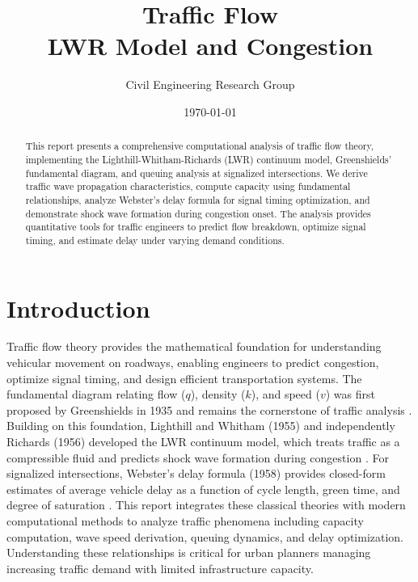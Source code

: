 \documentclass[11pt,a4paper]{article}
\title{Traffic Flow\\LWR Model and Congestion}
\author{Civil Engineering Research Group}
\date{\today}
\begin{document}
\maketitle

\begin{abstract}
This report presents a comprehensive computational analysis of traffic flow theory, implementing the Lighthill-Whitham-Richards (LWR) continuum model, Greenshields' fundamental diagram, and queuing analysis at signalized intersections. We derive traffic wave propagation characteristics, compute capacity using fundamental relationships, analyze Webster's delay formula for signal timing optimization, and demonstrate shock wave formation during congestion onset. The analysis provides quantitative tools for traffic engineers to predict flow breakdown, optimize signal timing, and estimate delay under varying demand conditions.
\end{abstract}

\section{Introduction}

Traffic flow theory provides the mathematical foundation for understanding vehicular movement on roadways, enabling engineers to predict congestion, optimize signal timing, and design efficient transportation systems. The fundamental diagram relating flow ($q$), density ($k$), and speed ($v$) was first proposed by Greenshields in 1935 and remains the cornerstone of traffic analysis \cite{Greenshields1935}. Building on this foundation, Lighthill and Whitham (1955) and independently Richards (1956) developed the LWR continuum model, which treats traffic as a compressible fluid and predicts shock wave formation during congestion \cite{Lighthill1955,Richards1956}. For signalized intersections, Webster's delay formula (1958) provides closed-form estimates of average vehicle delay as a function of cycle length, green time, and degree of saturation \cite{Webster1958}. This report integrates these classical theories with modern computational methods to analyze traffic phenomena including capacity computation, wave speed derivation, queuing dynamics, and delay optimization. Understanding these relationships is critical for urban planners managing increasing traffic demand with limited infrastructure capacity.
\end{document}
